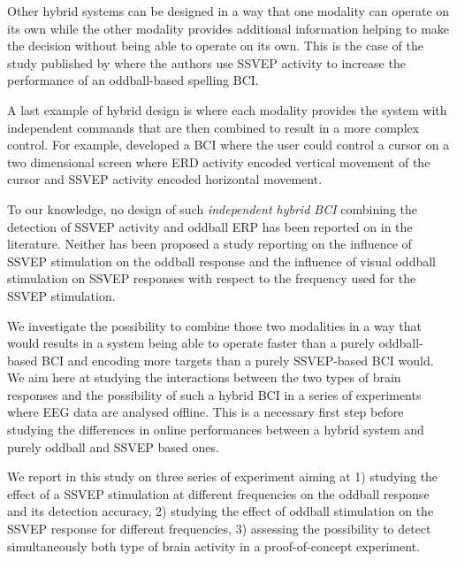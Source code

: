 \documentclass[10pt]{article}
\begin{document}
Other hybrid systems can be designed in a way that one modality can operate on its own while the other modality provides additional information helping to make the decision without being able to operate on its own.
This is the case of the study published by \textcite{Yin2013} where the authors use \ac{SSVEP} activity to increase the performance of an oddball-based spelling \ac{BCI}.

A last example of hybrid design is where each modality provides the system with independent commands that are then combined to result in a more complex control.
For example, \textcite{Allison2012} developed a \ac{BCI} where the user could control a cursor on a two dimensional screen where \ac{ERD} activity encoded vertical movement of the cursor and \ac{SSVEP} activity encoded horizontal movement.

To our knowledge, no design of such \emph{independent hybrid \ac{BCI}} combining the detection of \ac{SSVEP} activity and oddball \ac{ERP} has been reported on in the literature.
Neither has been proposed a study reporting on the influence of \ac{SSVEP} stimulation on the oddball response and the influence of visual oddball stimulation on \ac{SSVEP} responses with respect to the frequency used for the \ac{SSVEP} stimulation.

We investigate the possibility to combine those two modalities in a way that would results in a system being able to operate faster than a purely oddball-based \ac{BCI} and encoding more targets than a purely \ac{SSVEP}-based \ac{BCI} would.
We aim here at studying the interactions between the two types of brain responses and the possibility of such a hybrid \ac{BCI} in a series of experiments where \ac{EEG} data are analysed offline.
This is a necessary first step before studying the differences in online performances between a hybrid system and purely oddball and \ac{SSVEP} based ones.

We report in this study on three series of experiment aiming at
1) studying the effect of a \ac{SSVEP} stimulation at different frequencies on the oddball response and its detection accuracy,
2) studying the effect of oddball stimulation on the \ac{SSVEP} response for different frequencies,
3) assessing the possibility to detect simultaneously both type of brain activity in a proof-of-concept experiment.
\end{document}
